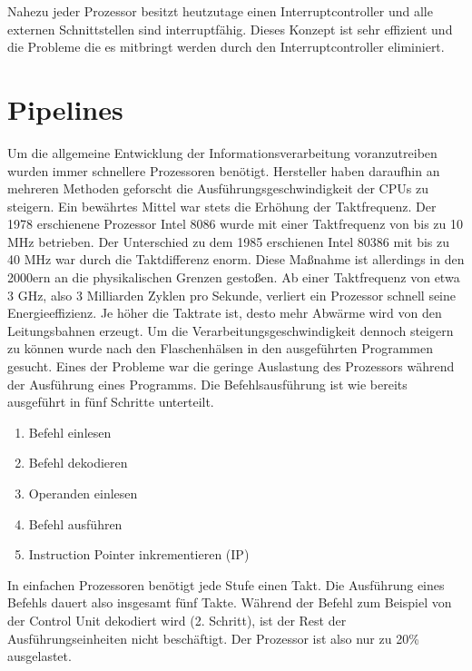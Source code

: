 \documentclass[12pt]{article}
\begin{document}
\par\smallskip\noindent Nahezu jeder Prozessor besitzt heutzutage einen Interruptcontroller und alle externen Schnittstellen sind interruptfähig. Dieses Konzept ist sehr effizient und die Probleme die es mitbringt werden durch den Interruptcontroller eliminiert.

\newpage
\section{Pipelines}
Um die allgemeine Entwicklung der Informationsverarbeitung voranzutreiben wurden immer schnellere Prozessoren benötigt. Hersteller haben daraufhin an mehreren Methoden geforscht die Ausführungsgeschwindigkeit der CPUs zu steigern. Ein bewährtes Mittel war stets die Erhöhung der Taktfrequenz. Der 1978 erschienene Prozessor Intel 8086 wurde mit einer Taktfrequenz von bis zu 10 MHz betrieben. Der Unterschied zu dem 1985 erschienen Intel 80386 mit bis zu 40 MHz war durch die Taktdifferenz enorm. Diese Maßnahme ist allerdings in den 2000ern an die physikalischen Grenzen gestoßen. Ab einer Taktfrequenz von etwa 3 GHz, also 3 Milliarden Zyklen pro Sekunde, verliert ein Prozessor schnell seine Energieeffizienz. Je höher die Taktrate ist, desto mehr Abwärme wird von den Leitungsbahnen erzeugt.
Um die Verarbeitungsgeschwindigkeit dennoch steigern zu können wurde nach den Flaschenhälsen in den ausgeführten Programmen gesucht. Eines der  Probleme war die geringe Auslastung des Prozessors während der Ausführung eines Programms. Die Befehlsausführung ist wie bereits ausgeführt in fünf Schritte unterteilt.
\begin{enumerate}
\item Befehl einlesen
\item Befehl dekodieren
\item Operanden einlesen
\item Befehl ausführen 
\item Instruction Pointer inkrementieren (IP)
\end{enumerate}
In einfachen Prozessoren benötigt jede Stufe einen Takt. Die Ausführung eines Befehls dauert also insgesamt fünf Takte. Während der Befehl zum Beispiel von der Control Unit dekodiert wird (2. Schritt), ist der Rest der Ausführungseinheiten nicht beschäftigt. Der Prozessor ist also nur zu 20\% ausgelastet. 
\end{document}
